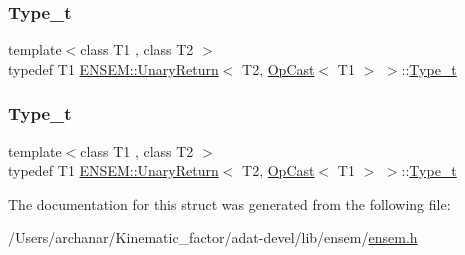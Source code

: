 \mbox{\label{structENSEM_1_1UnaryReturn_3_01T2_00_01OpCast_3_01T1_01_4_01_4_a0b016ddfbfa2d0867b9ea61f5768aa06}} 
\subsubsection{\texorpdfstring{Type\_t}{Type\_t}\hspace{0.1cm}{\footnotesize\ttfamily [2/3]}}
{\footnotesize\ttfamily template$<$class T1 , class T2 $>$ \\
typedef T1 \mbox{\hyperlink{structENSEM_1_1UnaryReturn}{E\+N\+S\+E\+M\+::\+Unary\+Return}}$<$ T2, \mbox{\hyperlink{structENSEM_1_1OpCast}{Op\+Cast}}$<$ T1 $>$ $>$\+::\mbox{\hyperlink{structENSEM_1_1UnaryReturn_3_01T2_00_01OpCast_3_01T1_01_4_01_4_a0b016ddfbfa2d0867b9ea61f5768aa06}{Type\+\_\+t}}}

\mbox{\label{structENSEM_1_1UnaryReturn_3_01T2_00_01OpCast_3_01T1_01_4_01_4_a0b016ddfbfa2d0867b9ea61f5768aa06}} 
\subsubsection{\texorpdfstring{Type\_t}{Type\_t}\hspace{0.1cm}{\footnotesize\ttfamily [3/3]}}
{\footnotesize\ttfamily template$<$class T1 , class T2 $>$ \\
typedef T1 \mbox{\hyperlink{structENSEM_1_1UnaryReturn}{E\+N\+S\+E\+M\+::\+Unary\+Return}}$<$ T2, \mbox{\hyperlink{structENSEM_1_1OpCast}{Op\+Cast}}$<$ T1 $>$ $>$\+::\mbox{\hyperlink{structENSEM_1_1UnaryReturn_3_01T2_00_01OpCast_3_01T1_01_4_01_4_a0b016ddfbfa2d0867b9ea61f5768aa06}{Type\+\_\+t}}}



The documentation for this struct was generated from the following file\+:\begin{DoxyCompactItemize}
\item 
/\+Users/archanar/\+Kinematic\+\_\+factor/adat-\/devel/lib/ensem/\mbox{\hyperlink{adat-devel_2lib_2ensem_2ensem_8h}{ensem.\+h}}\end{DoxyCompactItemize}
